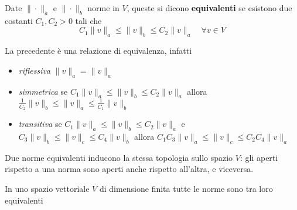 \begin{definition}
    Date \(\|\cdot \|_a\) e \(\|\cdot \|_b\) norme in \(V\), queste si dicono
    \textbf{equivalenti} se esistono due costanti \(C_{1}, C_{2} >0\) tali che
    \[
        C_{1}\|v\|_a \le \|v\|_b \le C_{2}\|v\|_a \quad \forall v \in V
    \]
\end{definition}
\begin{remark}
    La precedente è una relazione di equivalenza, infatti
    \begin{itemize}
        \item \emph{riflessiva} \(\|v\|_a = \|v\|_a\)
        \item \emph{simmetrica} se \(C_{1}\|v\|_a \le \|v\|_b \le C_{2}\|v\|_a\)
            allora \(\frac{1}{C_{2}}\|v\|_b \le \|v\|_a \le \frac{1}{C_{1}}\|v\|_b\)
        \item \emph{transitiva} se \(C_{1}\|v\|_a \le \|v\|_b \le C_{2}\|v\|_a\)
            e \(C_{3}\|v\|_b \le \|v\|_c \le C_{4}\|v\|_b\) allora
            \(C_{1}C_{3}\|v\|_a \le \|v\|_c \le C_{2}C_{4}\|v\|_a\)
    \end{itemize}
\end{remark}
\begin{proposition}
    Due norme equivalenti inducono la stessa topologia sullo spazio \(V\): gli
    aperti rispetto a una norma sono aperti anche rispetto all'altra, e
    viceversa.
\end{proposition}
\begin{proposition}\label{prop:norme-equivalenti}
    In uno spazio vettoriale \(V\) di dimensione finita tutte le norme sono tra
    loro equivalenti
\end{proposition}
